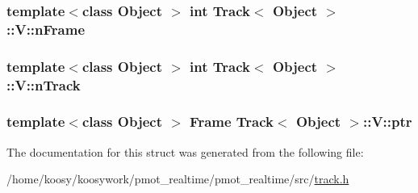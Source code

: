 \hypertarget{struct_track_1_1_v_a7283beb46beadf59be6232bba6ea702f}{
\subsubsection[{n\-Frame}]{\setlength{\rightskip}{0pt plus 5cm}template$<$class Object $>$ int {\bf \-Track}$<$ \-Object $>$\-::{\bf \-V\-::n\-Frame}}}\label{struct_track_1_1_v_a7283beb46beadf59be6232bba6ea702f}
\hypertarget{struct_track_1_1_v_a914952a4c8d2faada7171d422d138a14}{
\subsubsection[{n\-Track}]{\setlength{\rightskip}{0pt plus 5cm}template$<$class Object $>$ int {\bf \-Track}$<$ \-Object $>$\-::{\bf \-V\-::n\-Track}}}\label{struct_track_1_1_v_a914952a4c8d2faada7171d422d138a14}
\hypertarget{struct_track_1_1_v_a20c729267895989b7cb2d6f8e6c8676f}{
\subsubsection[{ptr}]{\setlength{\rightskip}{0pt plus 5cm}template$<$class Object $>$ {\bf \-Frame} {\bf \-Track}$<$ \-Object $>$\-::{\bf \-V\-::ptr}}}\label{struct_track_1_1_v_a20c729267895989b7cb2d6f8e6c8676f}


\-The documentation for this struct was generated from the following file\-:\begin{DoxyCompactItemize}
\item 
/home/koosy/koosywork/pmot\-\_\-realtime/pmot\-\_\-realtime/src/\hyperlink{track_8h}{track.\-h}\end{DoxyCompactItemize}
